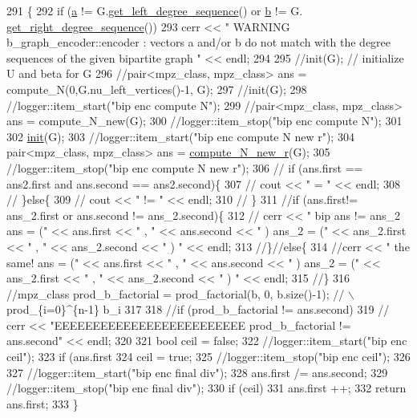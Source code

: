 \begin{DoxyCode}
291 \{
292   \textcolor{keywordflow}{if} (\hyperlink{classb__graph__encoder_afd22d167f495cd85b41397f337c377c2}{a} != G.\hyperlink{classb__graph_afd65fb655f7e24217393a10533b87d3c}{get\_left\_degree\_sequence}() or \hyperlink{classb__graph__encoder_a767826e268702e45ab71565e096a52b8}{b} != G.
      \hyperlink{classb__graph_a2711566385b92b02f4c03abdc1f9a582}{get\_right\_degree\_sequence}())
293     cerr << \textcolor{stringliteral}{" WARNING b\_graph\_encoder::encoder : vectors a and/or b do not match with the degree sequences
       of the given bipartite graph  "} << endl;
294 
295   \textcolor{comment}{//init(G); // initialize U and beta for G}
296   \textcolor{comment}{//pair<mpz\_class, mpz\_class> ans = compute\_N(0,G.nu\_left\_vertices()-1, G);}
297   \textcolor{comment}{//init(G);}
298   \textcolor{comment}{//logger::item\_start("bip enc compute N");}
299   \textcolor{comment}{//pair<mpz\_class, mpz\_class> ans = compute\_N\_new(G);}
300   \textcolor{comment}{//logger::item\_stop("bip enc compute N");}
301 
302   \hyperlink{classb__graph__encoder_a9b62ac0580191ac42b98d764046af7cb}{init}(G);
303   \textcolor{comment}{//logger::item\_start("bip enc compute N new r");}
304   pair<mpz\_class, mpz\_class> ans = \hyperlink{classb__graph__encoder_aa2e816b095e96eecacdbf805d79db1af}{compute\_N\_new\_r}(G);
305   \textcolor{comment}{//logger::item\_stop("bip enc compute N new r");}
306   \textcolor{comment}{// if (ans.first == ans2.first and ans.second == ans2.second)\{}
307   \textcolor{comment}{//   cout << " = " << endl;}
308   \textcolor{comment}{// \}else\{}
309   \textcolor{comment}{//   cout << " != " << endl;}
310   \textcolor{comment}{// \}}
311   \textcolor{comment}{//if (ans.first!= ans\_2.first or ans.second != ans\_2.second)\{}
312   \textcolor{comment}{//  cerr << " bip ans != ans\_2 ans = (" << ans.first << " , " << ans.second <<  " ) ans\_2 = (" <<
       ans\_2.first << " , " << ans\_2.second << " ) "  << endl;}
313   \textcolor{comment}{//\}//else\{}
314   \textcolor{comment}{//cerr << " the same! ans = (" << ans.first << " , " << ans.second <<  " ) ans\_2 = (" << ans\_2.first << "
       , " << ans\_2.second << " ) "  << endl;}
315   \textcolor{comment}{//\}}
316   \textcolor{comment}{//mpz\_class prod\_b\_factorial = prod\_factorial(b, 0, b.size()-1); // \(\backslash\)prod\_\{i=0\}^\{n-1\} b\_i}
317 
318   \textcolor{comment}{//if (prod\_b\_factorial != ans.second)}
319   \textcolor{comment}{//  cerr << "EEEEEEEEEEEEEEEEEEEEEEEEE prod\_b\_factorial != ans.second" << endl;}
320 
321   \textcolor{keywordtype}{bool} ceil = \textcolor{keyword}{false};
322   \textcolor{comment}{//logger::item\_start("bip enc ceil");}
323   \textcolor{keywordflow}{if} (ans.first %
324     ceil = \textcolor{keyword}{true};
325   \textcolor{comment}{//logger::item\_stop("bip enc ceil");}
326 
327   \textcolor{comment}{//logger::item\_start("bip enc final div");}
328   ans.first /= ans.second;
329   \textcolor{comment}{//logger::item\_stop("bip enc final div");}
330   \textcolor{keywordflow}{if} (ceil)
331     ans.first ++;
332   \textcolor{keywordflow}{return} ans.first;
333 \}
\end{DoxyCode}
